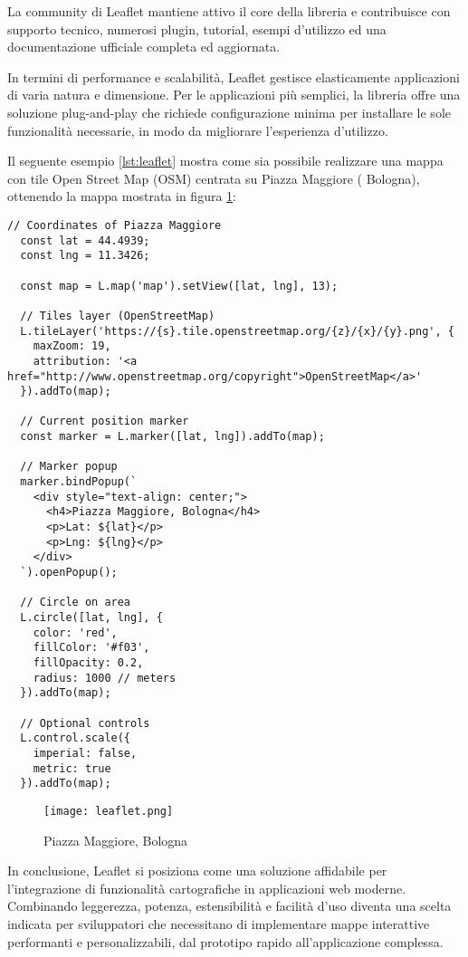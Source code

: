 La community di Leaflet mantiene attivo il core della libreria e contribuisce con supporto tecnico, numerosi plugin, tutorial, esempi d'utilizzo ed una documentazione ufficiale completa ed aggiornata.

In termini di performance e scalabilità, Leaflet gestisce elasticamente applicazioni di varia natura e dimensione. Per le applicazioni più semplici, la libreria offre una soluzione plug-and-play che richiede configurazione minima per installare le sole funzionalità necessarie, in modo da migliorare l'esperienza d'utilizzo.

Il seguente esempio \ref{lst:leaflet} mostra come sia possibile realizzare una mappa con tile Open Street Map (OSM) centrata su Piazza Maggiore ( Bologna), ottenendo la mappa mostrata in figura \ref{fig:leaflet}:

\begin{lstlisting}[caption={Mappa Bologna con Leaflet}, label=lst:leaflet]
  // Coordinates of Piazza Maggiore
  const lat = 44.4939;
  const lng = 11.3426;
    
  const map = L.map('map').setView([lat, lng], 13);
    
  // Tiles layer (OpenStreetMap)
  L.tileLayer('https://{s}.tile.openstreetmap.org/{z}/{x}/{y}.png', {
    maxZoom: 19,
    attribution: '<a href="http://www.openstreetmap.org/copyright">OpenStreetMap</a>'
  }).addTo(map);
    
  // Current position marker
  const marker = L.marker([lat, lng]).addTo(map);
    
  // Marker popup
  marker.bindPopup(`
    <div style="text-align: center;">
      <h4>Piazza Maggiore, Bologna</h4>
      <p>Lat: ${lat}</p>
      <p>Lng: ${lng}</p>
    </div>
  `).openPopup();

  // Circle on area
  L.circle([lat, lng], {
    color: 'red',
    fillColor: '#f03',
    fillOpacity: 0.2,
    radius: 1000 // meters
  }).addTo(map);
    
  // Optional controls
  L.control.scale({
    imperial: false,
    metric: true
  }).addTo(map);
\end{lstlisting}

\begin{figure}[H]
  \centering
  \texttt{[image: leaflet.png]}
  \caption{Piazza Maggiore, Bologna}
  \label{fig:leaflet}
\end{figure}

In conclusione, Leaflet si posiziona come una soluzione affidabile per l'integrazione di funzionalità cartografiche in applicazioni web moderne. Combinando leggerezza, potenza, estensibilità e facilità d'uso diventa una scelta indicata per sviluppatori che necessitano di implementare mappe interattive performanti e personalizzabili, dal prototipo rapido all'applicazione complessa.

